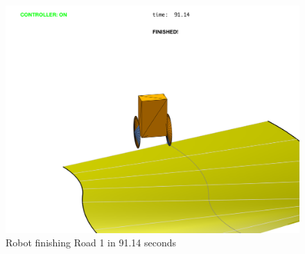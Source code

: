 \documentclass[12pt]{article}
\begin{document}
\begin{figure}[H]
\includegraphics[width=1\textwidth]{closedLoop.pdf}
\caption{Robot finishing Road 1 in 91.14 seconds}
\label{zeroHist}
\end{figure}
\newpage
\end{document}
